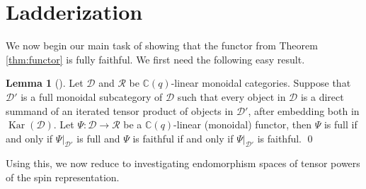 \documentclass[10pt]{amsart}
\numberwithin{equation}{section}
\theoremstyle{definition}
\newtheorem{lem}[thm]{Lemma}
\renewcommand{\to}{\rightarrow}
\DeclareMathOperator{\Kar}{Kar}
\begin{document}
\section{Ladderization}\label{s:ladder}

We now begin our main task of showing that the functor 
from Theorem \ref{thm:functor} is fully faithful. 
We first need the following easy result.

\begin{lem}[{\cite[Lemma 5.5]{BERT}}]
	\label{lem:reduction}
Let $\mathcal{D}$ and $\mathcal{R}$ be $\mathbb{C}(q)$-linear monoidal categories. 
Suppose that $\mathcal{D}'$ is a full monoidal subcategory of $\mathcal{D}$ such that
every object in $\mathcal{D}$ is a direct summand
of an iterated tensor product of objects in $\mathcal{D}'$, 
after embedding both in $\Kar(\mathcal{D})$.
Let $\Psi \colon \mathcal{D}\to \mathcal{R}$ be a $\mathbb{C}(q)$-linear (monoidal) functor,
then $\Psi$ is full if and only if $\Psi|_{\mathcal{D}'}$ is full 
and $\Psi$ is faithful if and only if $\Psi|_{\mathcal{D}'}$ is faithful. \qed
	\end{lem}
	
Using this, we now reduce to investigating endomorphism spaces 
of tensor powers of the spin representation.
\end{document}

